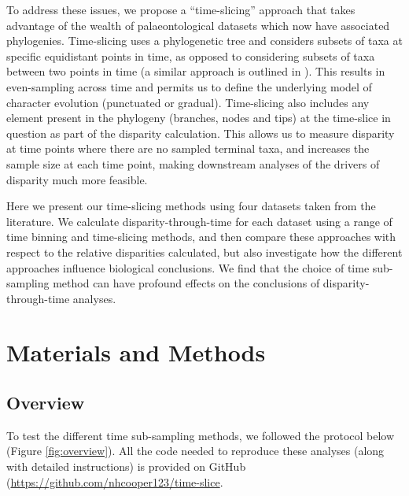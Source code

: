 \documentclass[12pt,a4paper]{article}
\begin{document}
To address these issues, we propose a ``time-slicing'' approach that takes advantage of the wealth of palaeontological datasets which now have associated phylogenies. 
Time-slicing uses a phylogenetic tree and considers subsets of taxa at specific equidistant points in time, as opposed to considering subsets of taxa between two points in time (a similar approach is outlined in \citep{halliday2016eutherian}).
This results in even-sampling across time and permits us to define the underlying model of character evolution (punctuated or gradual).  
Time-slicing also includes any element present in the phylogeny (branches, nodes and tips) at the time-slice in question as part of the disparity calculation.
This allows us to measure disparity at time points where there are no sampled terminal taxa, and increases the sample size at each time point, making downstream analyses of the drivers of disparity much more feasible.

Here we present our time-slicing methods using four datasets taken from the literature.
We calculate disparity-through-time for each dataset using a range of time binning and time-slicing methods, and then compare these approaches with respect to the relative disparities calculated, but also investigate how the different approaches influence biological conclusions. 
We find that the choice of time sub-sampling method can have profound effects on the conclusions of disparity-through-time analyses. 

\section{Materials and Methods}
\subsection{Overview}
\label{overview-section}
To test the different time sub-sampling methods, we followed the protocol below (Figure \ref{fig:overview}). 
All the code needed to reproduce these analyses (along with detailed instructions) is provided on GitHub (\url{https://github.com/nhcooper123/time-slice}.
\end{document}
